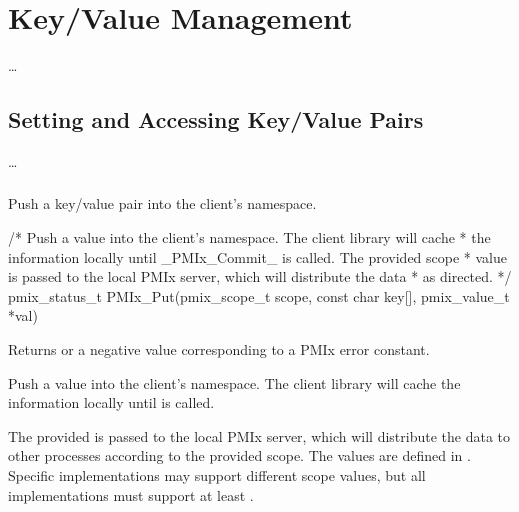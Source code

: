\chapter{Key/Value Management}
\label{chap:api_kv_mgmt}


\ldots

\section{Setting and Accessing Key/Value Pairs}
\label{chap:api_kv_mgmt:access}

\ldots

\subsection{}

\summary

Push a key/value pair into the client's namespace.

\format

\cspecificstart
\begin{codepar}
/* Push a value into the client's namespace. The client library will cache
 * the information locally until _PMIx_Commit_ is called. The provided scope
 * value is passed to the local PMIx server, which will distribute the data
 * as directed. */
pmix_status_t
PMIx_Put(pmix_scope_t scope,
         const char key[], pmix_value_t *val)
\end{codepar}
\cspecificend

\begin{arglist}
\end{arglist}

Returns  or a negative value corresponding to a PMIx error constant.

\descr

Push a value into the client's namespace.
The client library will cache the information locally until  is called.

The provided  is passed to the local PMIx server, which will distribute the data to other processes according to the provided scope.
The  values are defined in .
Specific implementations may support different scope values, but all implementations must support at least .

